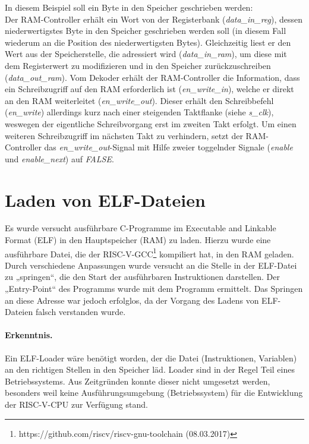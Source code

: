 In diesem Beispiel soll ein Byte in den Speicher geschrieben werden:\\
Der RAM-Controller erhält ein Wort von der Registerbank (\textit{data\_in\_reg}), dessen niederwertigstes Byte in den Speicher geschrieben werden soll (in diesem Fall wiederum an die Position des niederwertigsten Bytes).
Gleichzeitig liest er den Wert aus der Speicherstelle, die adressiert wird  (\textit{data\_in\_ram}), um diese mit dem Registerwert zu modifizieren und in den Speicher zurückzuschreiben (\textit{data\_out\_ram}).
Vom Dekoder erhält der RAM-Controller die Information, dass ein Schreibzugriff auf den RAM erforderlich ist (\textit{en\_write\_in}), welche er direkt an den RAM weiterleitet (\textit{en\_write\_out}).
Dieser erhält den Schreibbefehl (\textit{en\_write}) allerdings kurz nach einer steigenden Taktflanke (siehe \textit{s\_clk}), weswegen der eigentliche Schreibvorgang erst im zweiten Takt erfolgt.
Um einen weiteren Schreibzugriff im nächsten Takt zu verhindern, setzt der RAM-Controller das \textit{en\_write\_out}-Signal  mit Hilfe zweier toggelnder Signale (\textit{enable} und \textit{enable\_next}) auf \textit{FALSE}.

\section{Laden von ELF-Dateien}
Es wurde versucht ausführbare C-Programme im Executable and
Linkable Format (ELF) in den Hauptspeicher (RAM) zu laden. Hierzu wurde
eine ausführbare Datei, die der
RISC-V-GCC\footnote{https://github.com/riscv/riscv-gnu-toolchain
(08.03.2017)} kompiliert hat, in den RAM geladen. Durch verschiedene
Anpassungen wurde versucht an die Stelle in der ELF-Datei zu
„springen“, die den Start der ausführbaren Instruktionen darstellen.
Der „Entry-Point“ des Programms wurde mit dem Programm 
ermittelt. Das Springen an diese Adresse war jedoch erfolglos, da der
Vorgang des Ladens von ELF-Dateien falsch verstanden wurde. 

\paragraph{Erkenntnis.} Ein ELF-Loader wäre benötigt worden, der die Datei (Instruktionen,
Variablen) an den richtigen Stellen in den Speicher läd. Loader sind 
in der Regel Teil eines Betriebssystems. Aus Zeitgründen konnte dieser
nicht umgesetzt werden, besonders weil keine Ausführungsumgebung
(Betriebssystem) für die Entwicklung der RISC-V-CPU zur Verfügung stand.





